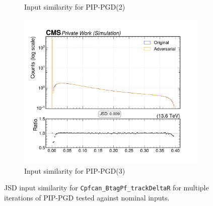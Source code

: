 \begin{figure}[htbp]
\begin{subfigure}[t]{0.32\textwidth}
    \caption*{Input similarity for PIP-PGD(2)}
  \end{subfigure}\hfill
  \begin{subfigure}[t]{0.32\textwidth}
    \includegraphics[width=\linewidth]{media/output/features/compare/combined_it_3/cmp_cpf_arr_Cpfcan_BtagPf_trackDeltaR.pdf}
    \caption*{Input similarity for PIP-PGD(3)}
  \end{subfigure}

  \caption*{JSD input similarity for \texttt{Cpfcan\_BtagPf\_trackDeltaR} for multiple iterations of PIP-PGD tested against nominal inputs.}
  \label{fig:combined_input_Cpfcan_BtagPf_trackDeltaR}
\end{figure}

